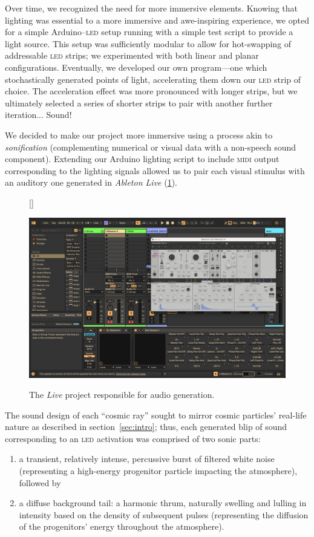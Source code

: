 \documentclass[12pt]{article}
\begin{document}
    Over time, we recognized the need for more immersive elements. Knowing that lighting was essential to a more immersive and awe-inspiring experience, we opted for a simple Arduino–\textsc{led} setup running with a simple test script to provide a light source. This setup was sufficiently modular to allow for hot-swapping of addressable \textsc{led} strips; we experimented with both linear and planar configurations. Eventually, we developed our own program—one which stochastically generated points of light, accelerating them down our \textsc{led} strip of choice. The acceleration effect was more pronounced with longer strips, but we ultimately selected a series of shorter strips to pair with another further iteration... Sound!

    We decided to make our project more immersive using a process akin to \textit{sonification} (complementing numerical or visual data with a non-speech sound component). Extending our Arduino lighting script to include \textsc{midi} output corresponding to the lighting signals allowed us to pair each visual stimulus with an auditory one generated in \textit{Ableton Live} (\cref{fig:midi-particles}).
    \begin{figure}[h]
        [\FBwidth]
        {\caption{The \textit{Live} project responsible for audio generation.}\label{fig:midi-particles}}
        {\includegraphics[width=11.3cm]{images/live-midi-particles.png}}
    \end{figure}
    The sound design of each ``cosmic ray'' sought to mirror cosmic particles' real-life nature as described in section~\ref{sec:intro}; thus, each generated blip of sound corresponding to an \textsc{led} activation was comprised of two sonic parts:
    \begin{enumerate}
        \item   a transient, relatively intense, percussive burst of filtered white noise (representing a high-energy progenitor particle impacting the atmosphere), followed by
        \item   a diffuse background tail: a harmonic thrum, naturally swelling and lulling in intensity based on the density of subsequent pulses (representing the diffusion of the progenitors' energy throughout the atmosphere).
    \end{enumerate}
    
\end{document}
